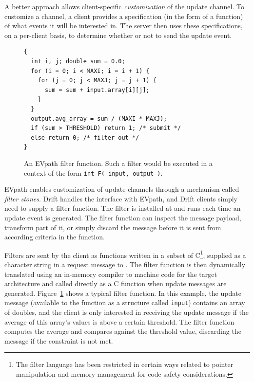 A better approach allows client-specific {\em customization} of the update channel.  To customize a
channel, a client provides a specification (in the form of a function) of what events it will be
interested in. The server then uses these specifications, on a per-client basis, to determine whether or
not to send the update event.

\begin{figure}
  \begin{centering}
    \begin{lstlisting}
{
  int i, j; double sum = 0.0;
  for (i = 0; i < MAXI; i = i + 1) {
    for (j = 0; j < MAXJ; j = j + 1) {
      sum = sum + input.array[i][j];  
    }
  }
  output.avg_array = sum / (MAXI * MAXJ);
  if (sum > THRESHOLD) return 1; /* submit */
  else return 0; /* filter out */
}
\end{lstlisting}
\caption{An EVpath filter function.  Such a filter would be executed in a context of the form \texttt{int
    F( input, output )}.}
\label{fig:filter}
\end{centering}
\end{figure}

EVpath enables customization of update channels through a mechanism called \emph{filter stones}.  Drift
handles the interface with EVpath, and Drift clients simply need to supply a filter function.  The filter is
installed at \driftd and runs each time an update event is generated.  The filter function can inspect
the message payload, transform part of it, or simply discard the message before it is sent from \driftd
according criteria in the function.  

Filters are sent by the client as functions written in a subset of C\footnote{The filter language has
  been restricted in certain ways related to pointer manipulation and memory management for code safety
  considerations.}, supplied as a character string in a request message to \driftd.  The filter function
is then dynamically translated using an in-memory compiler to machine code for the target architecture
and called directly as a C function when update messages are generated.  Figure~\ref{fig:filter} shows a
typical filter function.  In this example, the update message (available to the function as a structure
called \texttt{input}) contains an array of doubles, and the client is only interested in receiving the
update message if the average of this array's values is above a certain threshold.  The filter function
computes the average and compares against the threshold value, discarding the message if the constraint
is not met.

